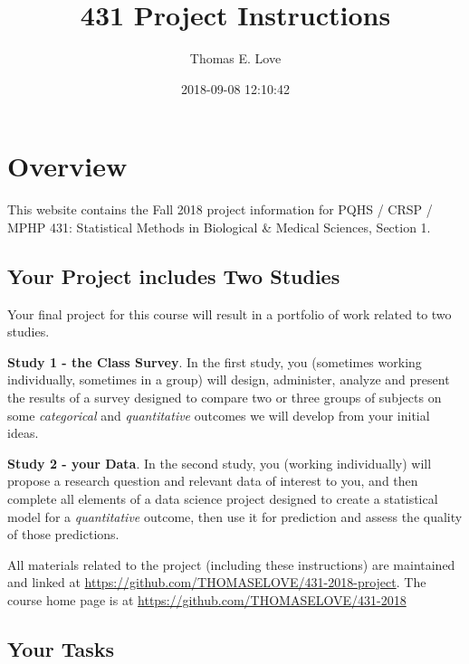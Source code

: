 \documentclass[]{book}
\title{431 Project Instructions}
\author{Thomas E. Love}
\date{2018-09-08 12:10:42}
\theoremstyle{definition}
\theoremstyle{definition}
\theoremstyle{definition}
\theoremstyle{remark}
\begin{document}
\maketitle

{
\setcounter{tocdepth}{1}
\tableofcontents
}
\hypertarget{overview}{%
\chapter*{Overview}\label{overview}}

This website contains the Fall 2018 project information for PQHS / CRSP
/ MPHP 431: Statistical Methods in Biological \& Medical Sciences,
Section 1.

\hypertarget{your-project-includes-two-studies}{%
\section*{Your Project includes Two
Studies}\label{your-project-includes-two-studies}}

Your final project for this course will result in a portfolio of work
related to two studies.

\textbf{Study 1 - the Class Survey}. In the first study, you (sometimes
working individually, sometimes in a group) will design, administer,
analyze and present the results of a survey designed to compare two or
three groups of subjects on some \emph{categorical} and
\emph{quantitative} outcomes we will develop from your initial ideas.

\textbf{Study 2 - your Data}. In the second study, you (working
individually) will propose a research question and relevant data of
interest to you, and then complete all elements of a data science
project designed to create a statistical model for a \emph{quantitative}
outcome, then use it for prediction and assess the quality of those
predictions.

All materials related to the project (including these instructions) are
maintained and linked at
\url{https://github.com/THOMASELOVE/431-2018-project}. The course home
page is at \url{https://github.com/THOMASELOVE/431-2018}

\hypertarget{your-tasks}{%
\section*{Your Tasks}\label{your-tasks}}
\end{document}
